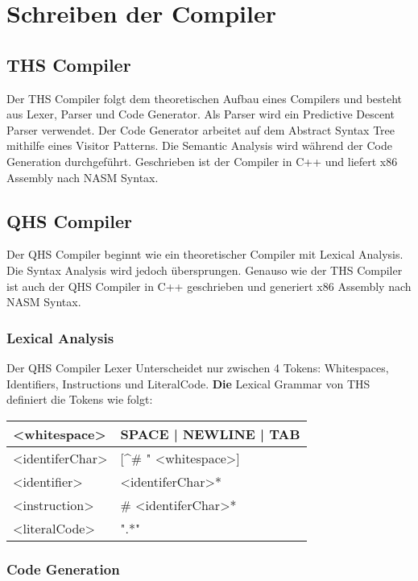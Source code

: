 \chapter{Schreiben der Compiler}

\section{THS Compiler}
Der THS Compiler folgt dem theoretischen Aufbau eines Compilers und besteht aus Lexer, Parser und Code Generator. Als Parser wird ein Predictive Descent Parser verwendet.
Der Code Generator arbeitet auf dem Abstract Syntax Tree mithilfe eines Visitor Patterns. Die Semantic Analysis wird während der Code Generation durchgeführt. Geschrieben ist der Compiler in C++ und liefert x86 Assembly nach NASM Syntax.

\section{QHS Compiler}
Der QHS Compiler beginnt wie ein theoretischer Compiler mit Lexical Analysis. Die Syntax Analysis wird jedoch übersprungen. Genauso wie der THS Compiler ist auch der QHS Compiler in C++ geschrieben und
generiert x86 Assembly nach NASM Syntax.

\subsection{Lexical Analysis}
Der QHS Compiler Lexer Unterscheidet nur zwischen 4 Tokens: Whitespaces, Identifiers, Instructions und LiteralCode. \textbf{Die} Lexical Grammar von THS definiert die Tokens wie folgt:

\begin{table}[h]
    \centering
    \begin{tabular}{l|l}
    \textless{}whitespace\textgreater{}    & SPACE | NEWLINE | TAB                                           \\ \hline
    \textless{}identiferChar\textgreater{} & {[}\textasciicircum \# " \textless{}whitespace\textgreater{}{]} \\ \hline
    \textless{}identifier\textgreater{}    & \textless{}identiferChar\textgreater{}*                         \\ \hline
    \textless{}instruction\textgreater{}   & \# \textless{}identiferChar\textgreater{}*                      \\ \hline
    \textless{}literalCode\textgreater{}   & ".*"                                                         
    \end{tabular}
\end{table}

\subsection{Code Generation}